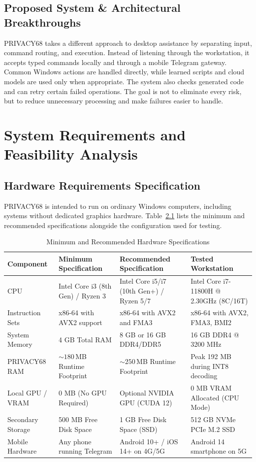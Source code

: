 \documentclass[12pt,letterpaper,oneside]{report}
\begin{document}
\section{Proposed System \& Architectural Breakthroughs}
PRIVACY68 takes a different approach to desktop assistance by separating input, command routing, and execution. Instead of listening through the workstation, it accepts typed commands locally and through a mobile Telegram gateway. Common Windows actions are handled directly, while learned scripts and cloud models are used only when appropriate. The system also checks generated code and can retry certain failed operations. The goal is not to eliminate every risk, but to reduce unnecessary processing and make failures easier to handle.

\chapter{System Requirements and Feasibility Analysis}
\section{Hardware Requirements Specification}
PRIVACY68 is intended to run on ordinary Windows computers, including systems without dedicated graphics hardware. Table~\ref{tab:hardware_req} lists the minimum and recommended specifications alongside the configuration used for testing.

\begin{table}[H]
\centering
\caption{Minimum and Recommended Hardware Specifications}
\label{tab:hardware_req}
\begin{tabularx}{\textwidth}{|l|X|X|X|}
\hline
\textbf{Component} & \textbf{Minimum Specification} & \textbf{Recommended Specification} & \textbf{Tested Workstation}\\ \hline
CPU & Intel Core i3 (8th Gen) / Ryzen 3 & Intel Core i5/i7 (10th Gen+) / Ryzen 5/7 & Intel Core i7-11800H @ 2.30GHz (8C/16T)\\ \hline
Instruction Sets & x86-64 with AVX2 support & x86-64 with AVX2 and FMA3 & x86-64 with AVX2, FMA3, BMI2\\ \hline
System Memory & 4 GB Total RAM & 8 GB or 16 GB DDR4/DDR5 & 16 GB DDR4 @ 3200 MHz\\ \hline
PRIVACY68 RAM & $\sim 180$\,MB Runtime Footprint & $\sim 250$\,MB Runtime Footprint & Peak 192 MB during INT8 decoding\\ \hline
Local GPU / VRAM & 0 MB (No GPU Required) & Optional NVIDIA GPU (CUDA 12) & 0 MB VRAM Allocated (CPU Mode)\\ \hline
Secondary Storage & 500 MB Free Disk Space & 1 GB Free Disk Space (SSD) & 512 GB NVMe PCIe M.2 SSD\\ \hline
Mobile Hardware & Any phone running Telegram & Android 10+ / iOS 14+ on 4G/5G & Android 14 smartphone on 5G\\ \hline
\end{tabularx}
\end{table}
\end{document}
